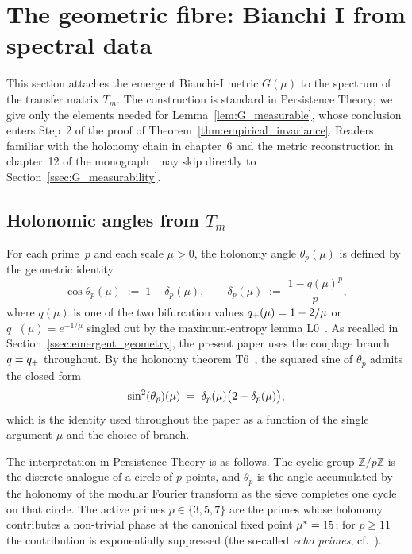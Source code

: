 \section{The geometric fibre: Bianchi I from spectral data}
\label{sec:geometric_fiber}

This section attaches the emergent Bianchi-I metric $G(\mu)$ to the
spectrum of the transfer matrix $T_m$. The construction is standard
in Persistence Theory; we give only the elements needed for
Lemma~\ref{lem:G_measurable}, whose conclusion enters Step~2 of the
proof of Theorem~\ref{thm:empirical_invariance}. Readers familiar
with the holonomy chain in chapter~6 and the metric reconstruction
in chapter~12 of the monograph~\cite{PT_Monograph} may skip directly
to Section~\ref{ssec:G_measurability}.

\subsection{Holonomic angles from $T_m$}
\label{ssec:holonomic_angles}

For each prime~$p$ and each scale $\mu > 0$, the holonomy angle
$\theta_p(\mu)$ is defined by the geometric identity
\begin{equation}
  \cos \theta_p(\mu) \;:=\; 1 - \delta_p(\mu),
  \qquad
  \delta_p(\mu) \;:=\; \frac{1 - q(\mu)^p}{p},
  \label{eq:theta_p_def}
\end{equation}
where $q(\mu)$ is one of the two bifurcation values
$q_{+}(\mu) = 1 - 2/\mu$ or $q_-(\mu) = e^{-1/\mu}$ singled out by
the maximum-entropy lemma L0~\cite[Ch.~3]{PT_Monograph}. As recalled
in Section~\ref{ssec:emergent_geometry}, the present paper uses the
couplage branch $q = q_{+}$ throughout. By the holonomy theorem
T6~\cite[Ch.~6,~Thm.~T6]{PT_Monograph}, the squared sine of
$\theta_p$ admits the closed form
\begin{equation}
  \sin^2(\theta_{p})(\mu) \;=\; \delta_p(\mu)\bigl(2 - \delta_p(\mu)\bigr),
  \label{eq:sin2_T6}
\end{equation}
which is the identity used throughout the paper as a function of the
single argument $\mu$ and the choice of branch.

The interpretation in Persistence Theory is as follows. The cyclic
group $\mathbb{Z}/p\mathbb{Z}$ is the discrete analogue of a circle
of $p$ points, and $\theta_p$ is the angle accumulated by the
holonomy of the modular Fourier transform as the sieve completes one
cycle on that circle. The active primes $p \in \{3, 5, 7\}$ are the
primes whose holonomy contributes a non-trivial phase at the
canonical fixed point ${\mu^{*}} = 15$; for $p \geq 11$ the
contribution is exponentially suppressed (the so-called
\emph{echo primes}, cf.~\cite[Ch.~22]{PT_Monograph}).


